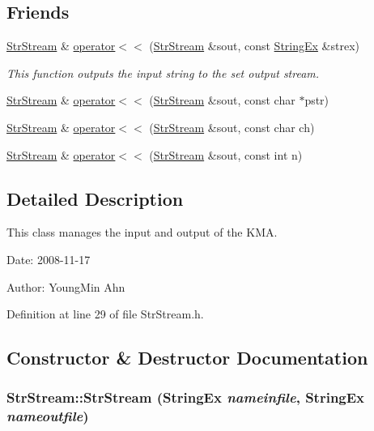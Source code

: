 \subsection*{Friends}
\begin{CompactItemize}
\item 
\hyperlink{classkmaOrange_1_1StrStream}{StrStream} \& \hyperlink{classkmaOrange_1_1StrStream_410bc1a06275f285fbd7e5e77f5584a2}{operator$<$$<$} (\hyperlink{classkmaOrange_1_1StrStream}{StrStream} \&sout, const \hyperlink{classStringEx}{StringEx} \&strex)
\begin{CompactList}\small\item\em This function outputs the input string to the set output stream. \item\end{CompactList}\item 
\hyperlink{classkmaOrange_1_1StrStream}{StrStream} \& \hyperlink{classkmaOrange_1_1StrStream_b601ecae9d38437878116f4d2f1a70c9}{operator$<$$<$} (\hyperlink{classkmaOrange_1_1StrStream}{StrStream} \&sout, const char $\ast$pstr)
\item 
\hyperlink{classkmaOrange_1_1StrStream}{StrStream} \& \hyperlink{classkmaOrange_1_1StrStream_c6389cf6b3e7bf3dd2b00fd219351eb4}{operator$<$$<$} (\hyperlink{classkmaOrange_1_1StrStream}{StrStream} \&sout, const char ch)
\item 
\hyperlink{classkmaOrange_1_1StrStream}{StrStream} \& \hyperlink{classkmaOrange_1_1StrStream_3dc307219c9aa34369ba14448e84f855}{operator$<$$<$} (\hyperlink{classkmaOrange_1_1StrStream}{StrStream} \&sout, const int n)
\end{CompactItemize}


\subsection{Detailed Description}
This class manages the input and output of the KMA. 

\begin{Desc}
\item[Date:]2008-11-17 \end{Desc}
\begin{Desc}
\item[Author:]YoungMin Ahn \end{Desc}


Definition at line 29 of file StrStream.h.

\subsection{Constructor \& Destructor Documentation}
\hypertarget{classkmaOrange_1_1StrStream_1298b43a81e72deebca46f146dad02e8}{
\subsubsection[{StrStream}]{\setlength{\rightskip}{0pt plus 5cm}StrStream::StrStream ({\bf StringEx} {\em nameinfile}, \/  {\bf StringEx} {\em nameoutfile})}}
\label{classkmaOrange_1_1StrStream_1298b43a81e72deebca46f146dad02e8}


